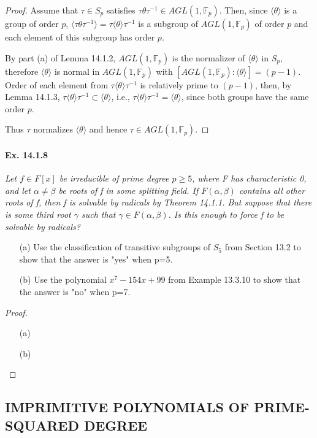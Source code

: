 \documentclass[11pt,a4paper]{article}
\begin{document}
\begin{proof}
Assume that $\tau\in S_p$ satisfies $\tau\theta\tau^{-1}\in AGL(1,\mathbb{F}_p)$. Then, since $\langle\theta\rangle$ is a group of order $p$, $\langle\tau\theta\tau^{-1}\rangle=\tau\langle\theta\rangle\tau^{-1}$ is a subgroup of $AGL(1,\mathbb{F}_p)$ of order $p$ and each element of this subgroup has order $p$.

By part (a) of Lemma 14.1.2, $AGL(1,\mathbb{F}_p)$ is the normalizer of $\langle\theta\rangle$ in $S_p$, therefore $\langle\theta\rangle$ is normal in $AGL(1,\mathbb{F}_p)$ with $[AGL(1,\mathbb{F}_p):\langle\theta\rangle]=(p-1)$. Order of each element from $\tau\langle\theta\rangle\tau^{-1}$ is relatively prime to $(p-1)$, then, by Lemma 14.1.3, $\tau\langle\theta\rangle\tau^{-1}\subset\langle\theta\rangle$, i.e., $\tau\langle\theta\rangle\tau^{-1}=\langle\theta\rangle$, since both groups have the same order $p$.  

Thus $\tau$ normalizes $\langle\theta\rangle$ and hence $\tau\in AGL(1,\mathbb{F}_p)$.
\end{proof}
\paragraph{Ex. 14.1.8}

{\it Let $f\in F[x]$ be irreducible of prime degree $p\geq 5$, where F has characteristic 0, and let $\alpha\ne\beta$ be roots of f in some splitting field. If $F(\alpha,\beta)$ contains all other roots of f, then f is solvable by radicals by Theorem 14.1.1. But suppose that there is some third root $\gamma$ such that $\gamma\in F(\alpha,\beta)$. Is this enough to force f to be solvable by radicals?
\begin{enumerate}
\item[(a)] Use the classification of transitive subgroups of $S_5$ from Section 13.2 to show that the answer is "yes" when p=5.
\item[(b)] Use the polynomial $x^7-154x+99$ from Example 13.3.10 to show that the answer is "no" when p=7.
\end{enumerate}
}
\begin{proof}
\begin{enumerate}
\item[(a)]  
\item[(b)] 
\end{enumerate}

\end{proof}

\subsection{IMPRIMITIVE POLYNOMIALS OF PRIME-SQUARED DEGREE}
\end{document}
